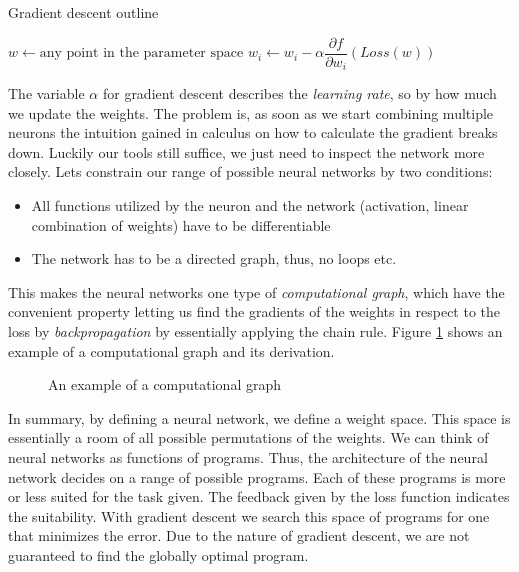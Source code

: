 \begin{algorithm}
    \caption{Gradient descent outline \cite[p. 1253]{russell_artificial_2021}}\label{alg:gradient_descent}
    \begin{algorithmic}
        \State $w \gets \text{any point in the parameter space}$
        \State $w_i \gets w_i - \alpha \dfrac{\partial f}{\partial w_i}(Loss(w))$
        \EndFor
        \EndWhile
    \end{algorithmic}
\end{algorithm}

The variable $ \alpha $ for gradient descent describes the \textit{learning rate}, so by how much we update the weights. The problem is, as soon as we start combining multiple neurons the intuition gained in calculus on how to calculate the gradient breaks down. Luckily our tools still suffice, we just need to inspect the network more closely. Lets constrain our range of possible neural networks by two conditions:

\begin{itemize}
    \item All functions utilized by the neuron and the network (activation, linear combination of weights) have to be differentiable
    \item The network has to be a directed graph, thus, no loops etc.
\end{itemize}

This makes the neural networks one type of \textit{computational graph}, which have the convenient property letting us find the gradients of the weights in respect to the loss by \textit{backpropagation} by essentially applying the chain rule. Figure \ref{computational_graph} shows an example of a computational graph and its derivation.

\begin{figure}[!h]
    \centering
    \caption{An example of a computational graph}
    \label{computational_graph}
\end{figure}

In summary, by defining a neural network, we define a weight space. This space is essentially a room of all possible permutations of the weights. We can think of neural networks as functions of programs. Thus, the architecture of the neural network decides on a range of possible programs. Each of these programs is more or less suited for the task given. The feedback given by the loss function indicates the suitability. With gradient descent we search this space of programs for one that minimizes the error. Due to the nature of gradient descent, we are not guaranteed to find the globally optimal program.

